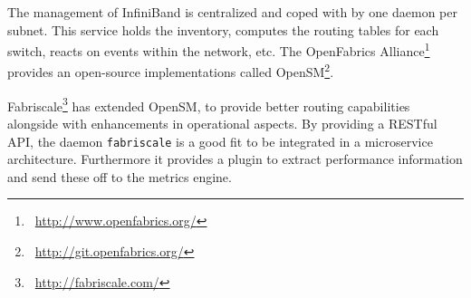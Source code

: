 The management of InfiniBand is centralized and coped with by one daemon per subnet. This service holds the inventory,
computes the routing tables for each switch, reacts on events within the network, etc.
The OpenFabrics Alliance\footnote{\Mundus~\url{http://www.openfabrics.org/}} provides an open-source implementations called OpenSM\footnote{\Mundus~\url{http://git.openfabrics.org/}}.


Fabriscale\footnote{\Mundus~\url{http://fabriscale.com/}} has extended OpenSM,
to provide better routing capabilities alongside with enhancements in operational aspects.
By providing a RESTful API, the daemon \texttt{fabriscale} is a good fit to be integrated in
a microservice architecture. Furthermore it provides a plugin to extract performance information and send these off to the metrics engine.
